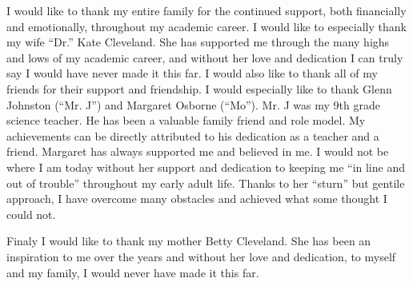 \noindent
	\indent I would like to thank my entire family for the continued support, both financially and emotionally, throughout my academic career. I would like to especially thank my wife ``Dr.'' Kate Cleveland. She has supported me through the many highs and lows of my academic career, and without her love and dedication I can truly say I would have never made it this far. I would also like to thank all of my friends for their support and friendship. I would especially like to thank Glenn Johnston (``Mr. J'') and Margaret Osborne (``Mo''). Mr. J was my 9th grade science teacher. He has been a valuable family friend and role model. My achievements can be directly attributed to his dedication as a teacher and a friend. Margaret has always supported me and believed in me. I would not be where I am today without her support and dedication to keeping me ``in line and out of trouble'' throughout my early adult life. Thanks to her ``sturn'' but gentile approach, I have overcome many obstacles and achieved what some thought I could not.
 
\noindent
	\indent Finaly I would like to thank my mother Betty Cleveland. She has been an inspiration to me over the years and without her love and dedication, to myself and my family, I would never have made it this far.
	\vspace{0.2in}
		

\thispagestyle{empty}
